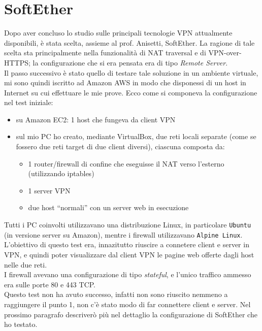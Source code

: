 \section{SoftEther}
Dopo aver concluso lo studio sulle principali tecnologie VPN attualmente disponibili,
è stata scelta, assieme al prof. Anisetti, SoftEther. La ragione di tale scelta
sta principalmente nella funzionalità di NAT traversal e di VPN-over-HTTPS; la
configurazione che si era pensata era di tipo \textit{Remote Server}.\\
Il passo successivo è stato quello di testare tale soluzione in un ambiente virtuale,
mi sono quindi iscritto ad Amazon AWS in modo che disponessi di un host in Internet
su cui effettuare le mie prove. Ecco come si componeva la configurazione nel test
iniziale:
\begin{itemize}
  \item su Amazon EC2: 1 host che fungeva da client VPN
  \item sul mio PC ho creato, mediante VirtualBox, due reti locali separate (come
  se fossero due reti target di due client diversi), ciascuna composta da:
  \begin{itemize}
    \item 1 router/firewall di confine che eseguisse il NAT verso l'esterno
    (utilizzando iptables)
    \item 1 server VPN
    \item due host ``normali'' con un server web in esecuzione
  \end{itemize}
\end{itemize}
Tutti i PC coinvolti utilizzavano una distribuzione Linux, in particolare \texttt{Ubuntu}
(in versione server su Amazon), mentre i firewall utilizzavano \texttt{Alpine Linux}.\\
L'obiettivo di questo test era, innazitutto riuscire a connetere client e server in
VPN, e quindi poter visualizzare dal client VPN le pagine web offerte dagli host
nelle due reti.\\
I firewall avevano una configurazione di tipo \textit{stateful}, e l'unico traffico
ammesso era sulle porte 80 e 443 TCP.\\
Questo test non ha avuto successo, infatti non sono riuscito nemmeno a raggiungere il
punto 1, non c'è stato modo di far connettere client e server. Nel prossimo paragrafo
descriverò più nel dettaglio la configurazione di SoftEther che ho testato.


